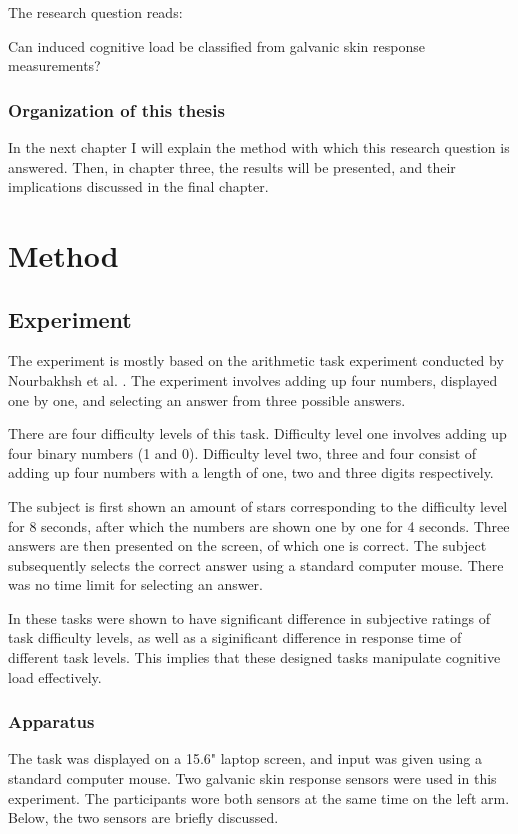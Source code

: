 \documentclass[11pt,leqno,a4paper]{report} %
\begin{document}
The research question reads:

\begin{center}
Can induced cognitive load be classified from galvanic skin response measurements?
\end{center}


\subsection{Organization of this thesis}
In the next chapter I will explain the method with which this research question is answered. Then, in chapter three, the results will be presented, and their implications discussed in the final chapter.

\chapter{Method}

\section{Experiment}
The experiment is mostly based on the arithmetic task experiment conducted by Nourbakhsh et al. \citep{Nourbakhsh2012}. The experiment involves adding up four numbers, displayed one by one, and selecting an answer from three possible answers.

There are four difficulty levels of this task. Difficulty level one involves adding up four binary numbers (1 and 0). Difficulty level two, three and four consist of adding up  four numbers with a length of one, two and three digits respectively.

The subject is first shown an amount of stars corresponding to the difficulty level for 8 seconds, after which the numbers are shown one by one for 4 seconds. Three answers are then presented on the screen, of which one is correct. The subject subsequently selects the correct answer using a standard computer mouse. There was no time limit for selecting an answer.

In \citet{Nourbakhsh2013} these tasks were shown to have significant difference in subjective ratings of task difficulty levels, as well as a siginificant difference in response time of different task levels. This implies that these designed tasks manipulate cognitive load effectively.


\subsection{Apparatus}
The task was displayed on a 15.6" laptop screen, and input was given using a standard computer mouse.
Two galvanic skin response sensors were used in this experiment. The participants wore both sensors at the same time on the left arm. Below, the two sensors are briefly discussed.
\end{document}
